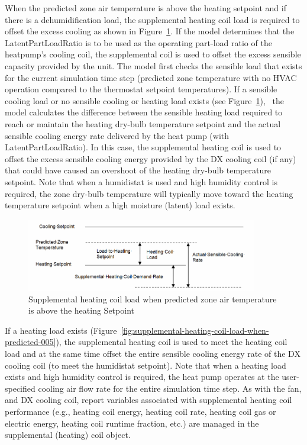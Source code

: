 When the predicted zone air temperature is above the heating setpoint and if there is a dehumidification load, the supplemental heating coil load is required to offset the excess cooling as shown in Figure~\ref{fig:supplemental-heating-coil-load-when-predicted-004}. If the model determines that the LatentPartLoadRatio is to be used as the operating part-load ratio of the heatpump's cooling coil, the supplemental coil is used to offset the excess sensible capacity provided by the unit. The model first checks the sensible load that exists for the current simulation time step (predicted zone temperature with no HVAC operation compared to the thermostat setpoint temperatures). If a sensible cooling load or no sensible cooling or heating load exists (see Figure~\ref{fig:supplemental-heating-coil-load-when-predicted-004}),~ the model calculates the difference between the sensible heating load required to reach or maintain the heating dry-bulb temperature setpoint and the actual sensible cooling energy rate delivered by the heat pump (with LatentPartLoadRatio). In this case, the supplemental heating coil is used to offset the excess sensible cooling energy provided by the DX cooling coil (if any) that could have caused an overshoot of the heating dry-bulb temperature setpoint. Note that when a humidistat is used and high humidity control is required, the zone dry-bulb temperature will typically move toward the heating temperature setpoint when a high moisture (latent) load exists.

\begin{figure}[hbtp] %
\centering
\includegraphics[width=0.9\textwidth, height=0.9\textheight, keepaspectratio=true]{media/image5262.png}
\caption{Supplemental heating coil load when predicted zone air temperature is above the heating Setpoint \protect \label{fig:supplemental-heating-coil-load-when-predicted-004}}
\end{figure}

If a heating load exists (Figure~\ref{fig:supplemental-heating-coil-load-when-predicted-005}), the supplemental heating coil is used to meet the heating coil load and at the same time offset the entire sensible cooling energy rate of the DX cooling coil (to meet the humidistat setpoint). Note that when a heating load exists and high humidity control is required, the heat pump operates at the user-specified cooling air flow rate for the entire simulation time step. As with the fan, and DX cooling coil, report variables associated with supplemental heating coil performance (e.g., heating coil energy, heating coil rate, heating coil gas or electric energy, heating coil runtime fraction, etc.) are managed in the supplemental (heating) coil object.

